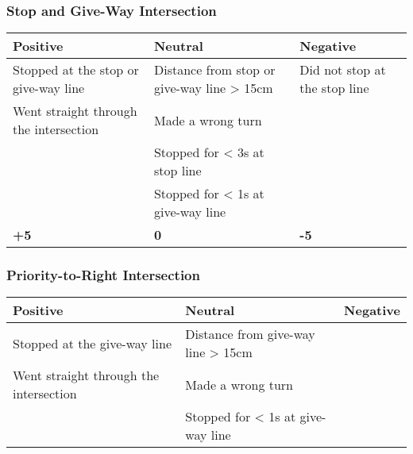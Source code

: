 {\begin{highlight}
		\subsubsection*{Stop and Give-Way Intersection}
		\begin{table}[H]
			\begin{tabularx}{\textwidth}{XXX}
				\toprule
				\textbf{Positive}                      & \textbf{Neutral}                           & \textbf{Negative}                              \\
				\midrule
				Stopped at the stop or give-way line   & Distance from stop or give-way line > 15cm & Did not stop at the stop line \footnotemark[3] \\
				Went straight through the intersection & Made a wrong turn \footnotemark[4]         &                                                \\
				                                       & Stopped for < 3s at stop line              &                                                \\
				                                       & Stopped for < 1s at give-way line          &                                                \\
				\topstrut
				\textbf{+5}                            & \textbf{0}                                 & \textbf{-5}                                    \\
				\bottomrule
			\end{tabularx}
		\end{table}

		\subsubsection*{Priority-to-Right Intersection}
		\begin{table}[H]
			\begin{tabularx}{\textwidth}{XXX}
				\toprule
				\textbf{Positive}                      & \textbf{Neutral}                   & \textbf{Negative}                    \\
				\midrule
				Stopped at the give-way line           & Distance from give-way line > 15cm &                                      \\
				Went straight through the intersection & Made a wrong turn \footnotemark[4] &                                      \\
				                                       & Stopped for < 1s at give-way line  &                                      \\


\end{tabularx}
\end{table}
\end{highlight}}
